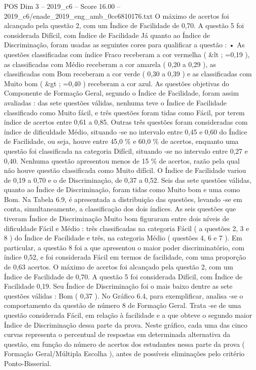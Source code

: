 \begin{textsample}{POS Dim 3 – 2019\_c6 – Score 16.00 – 2019\_c6/enade\_2019\_eng\_amb\_0cc6810176.txt}
O máximo de acertos foi alcançado pela questão 2, com um Índice de Facilidade de 0,70.
A questão 5 foi considerada Difícil, com Índice de Facilidade Já quanto ao Índice de Discriminação, foram usadas as seguintes cores para qualificar a questão : • As questões classificadas com índice Fraco receberam a cor vermelha ( \&lt ; =0,19 ), as classificadas com Médio receberam a cor amarela ( 0,20 a 0,29 ), as classificadas com Bom receberam a cor verde ( 0,30 a 0,39 ) e as classificadas com Muito bom ( \&gt ; =0,40 ) receberam a cor azul.
As questões objetivas do Componente de Formação Geral, segundo o Índice de Facilidade, foram assim avaliadas : das sete questões válidas, nenhuma teve o Índice de Facilidade classificado como Muito fácil, e três questões foram tidas como Fácil, por terem índice de acertos entre 0,61 a 0,85.
Outras três questões foram consideradas com índice de dificuldade Médio, situando -se no intervalo entre 0,45 e 0,60 do Índice de Facilidade, ou seja, houve entre 45,0 \% e 60,0 \% de acertos, enquanto uma questão foi classificada na categoria Difícil, situando -se no intervalo entre 0,27 e 0,40.
Nenhuma questão apresentou menos de 15 \% de acertos, razão pela qual não houve questão classificada como Muito difícil.
O Índice de Facilidade variou de 0,19 a 0,70 e o de Discriminação, de 0,37 a 0,52.
Seis das sete questões válidas, quanto ao Índice de Discriminação, foram tidas como Muito bom e uma como Bom.
Na Tabela 6.9, é apresentada a distribuição das questões, levando -se em conta, simultaneamente, a classificação dos dois índices.
As seis questões que tiveram Índice de Discriminação Muito bom figuraram entre dois níveis de dificuldade Fácil e Médio : três classificadas na categoria Fácil ( a questões 2, 3 e 8 ) do Índice de Facilidade e três, na categoria Médio ( questões 4, 6 e 7 ).
Em particular, a questão 8 foi a que apresentou o maior poder discriminatório, com índice 0,52, e foi considerada Fácil em termos de facilidade, com uma proporção de 0,63 acertos.
O máximo de acertos foi alcançado pela questão 2, com um Índice de Facilidade de 0,70.
A questão 5 foi considerada Difícil, com Índice de Facilidade 0,19.
Seu Índice de Discriminação foi o mais baixo dentre as sete questões válidas : Bom ( 0,37 ).
No Gráfico 6.4, para exemplificar, analisa -se o comportamento da questão de número 8 de Formação Geral.
Trata -se de uma questão considerada Fácil, em relação à facilidade e a que obteve o segundo maior Índice de Discriminação dessa parte da prova.
Neste gráfico, cada uma das cinco curvas representa o percentual de respostas em determinada alternativa da questão, em função do número de acertos dos estudantes nessa parte da prova ( Formação Geral/Múltipla Escolha ), antes de possíveis eliminações pelo critério Ponto-Bisserial.

\end{textsample}
